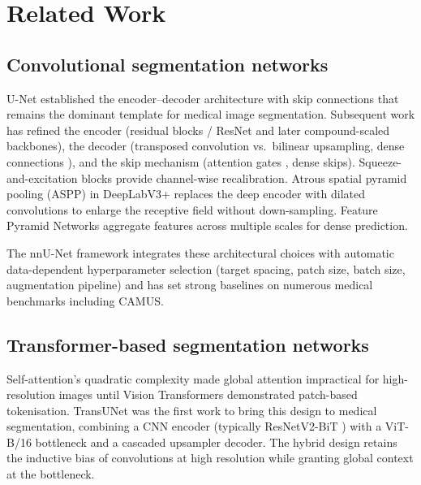 \section{Related Work}
\label{sec:related}

\subsection{Convolutional segmentation networks}
\label{sec:related-cnn}

U-Net \citep{ronneberger2015} established the encoder--decoder
architecture with skip connections that remains the dominant template for
medical image segmentation. Subsequent work has refined the encoder
(residual blocks / ResNet \citep{he2016} and later compound-scaled
backbones), the decoder
(transposed convolution vs.\ bilinear upsampling, dense connections
\citep{huang2017}), and the skip mechanism
(attention gates \citep{oktay2018}, dense skips). Squeeze-and-excitation
blocks \citep{hu2018} provide channel-wise recalibration. Atrous spatial
pyramid pooling (ASPP) in DeepLabV3+ \citep{chen2018encoder} replaces the
deep encoder with dilated convolutions to enlarge the receptive field
without down-sampling. Feature Pyramid Networks
\citep{lin2017} aggregate features across multiple scales for dense
prediction.

The nnU-Net framework \citep{isensee2021} integrates these architectural
choices with automatic data-dependent hyperparameter selection (target
spacing, patch size, batch size, augmentation pipeline) and has set
strong baselines on numerous medical benchmarks including CAMUS.

\subsection{Transformer-based segmentation networks}
\label{sec:related-trans}

Self-attention's quadratic complexity made global attention impractical
for high-resolution images until Vision Transformers
\citep{dosovitskiy2021} demonstrated patch-based tokenisation. TransUNet
\citep{chen2021transunet} was the first work to bring this design to
medical segmentation, combining a CNN encoder (typically ResNetV2-BiT
\citep{kolesnikov2020}) with a ViT-B/16 bottleneck and a cascaded
upsampler decoder. The hybrid design retains the inductive bias of
convolutions at high resolution while granting global context at the
bottleneck.

